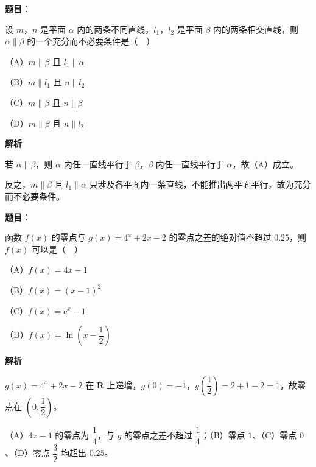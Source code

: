 \begin{answer}

\textbf{题目}：

设 $m$，$n$ 是平面 $\alpha$ 内的两条不同直线，$l_1$，$l_2$ 是平面 $\beta$ 内的两条相交直线，则 $\alpha\parallel\beta$ 的一个充分而不必要条件是（　）

（A）$m\parallel\beta$ 且 $l_1\parallel\alpha$

（B）$m\parallel l_1$ 且 $n\parallel l_2$

（C）$m\parallel\beta$ 且 $n\parallel\beta$

（D）$m\parallel\beta$ 且 $n\parallel l_2$

\textbf{解析}

若 $\alpha\parallel\beta$，则 $\alpha$ 内任一直线平行于 $\beta$，$\beta$ 内任一直线平行于 $\alpha$，故（A）成立。

反之，$m\parallel\beta$ 且 $l_1\parallel\alpha$ 只涉及各平面内一条直线，不能推出两平面平行。故为充分而不必要条件。


\end{answer}
\begin{answer}

\textbf{题目}：

函数 $f(x)$ 的零点与 $g(x)=4^x+2x-2$ 的零点之差的绝对值不超过 $0.25$，则 $f(x)$ 可以是（　）

（A）$f(x)=4x-1$

（B）$f(x)=(x-1)^2$

（C）$f(x)=\mathrm e^x-1$

（D）$f(x)=\ln\left(x-\dfrac12\right)$

\textbf{解析}

$g(x)=4^x+2x-2$ 在 $\mathbf R$ 上递增，$g(0)=-1$，$g\!\left(\dfrac12\right)=2+1-2=1$，故零点在 $\left(0,\dfrac12\right)$。

（A）$4x-1$ 的零点为 $\dfrac14$，与 $g$ 的零点之差不超过 $\dfrac14$；（B）零点 $1$、（C）零点 $0$、（D）零点 $\dfrac32$ 均超出 $0.25$。


\end{answer}
